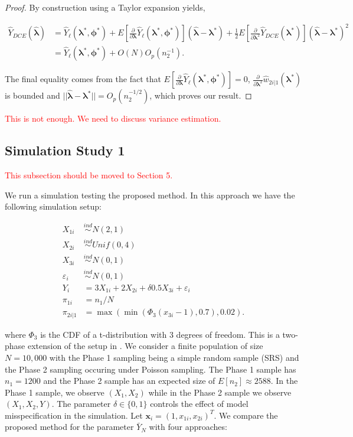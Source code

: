 \documentclass[12pt]{article}
\renewcommand{\bf}[1]{\mathbf{#1}}
\begin{document}
\begin{proof}
  By construction using a Taylor expansion yields,

  \begin{align*}
    \hat Y_{DCE}(\hat{\bm \lambda}) 
    &= \hat Y_\ell(\bm \lambda^*, \bm \phi^*) + 
    E\left[\frac{\partial}{\partial \bm \lambda}\hat Y_\ell(\bm \lambda^*,
    \bm \phi^*)\right](\hat{\bm \lambda} - \bm \lambda^*) + \frac{1}{2}
    E\left[\frac{\partial}{\partial \bm \lambda^2} \hat Y_{DCE}(\bm \lambda^*)\right] 
    (\hat{\bm \lambda} - \bm \lambda^*)^2\\
    &= \hat Y_\ell(\bm \lambda^*, \bm \phi^*) + O(N)O_p(n_2^{-1}).
  \end{align*}

  The final equality comes from the fact that 
  $E\left[\frac{\partial}{\partial \bm \lambda}
  \hat Y_\ell(\bm \lambda^*, \bm \phi^*)\right] = 0$,
  $\frac{\partial}{\partial \bm \lambda^2} \hat w_{2i|1}(\bm \lambda^*)$ is
  bounded and $||\hat{\bm \lambda} - \bm \lambda^*|| = O_p(n_2^{-1/2})$, which
  proves our result.
\end{proof}



\textcolor{red}{This is not enough. We need to discuss variance estimation. }
\subsection{Simulation Study 1}

\textcolor{red}{This subsection should be moved to Section 5. }

We run a simulation testing the proposed method. In this approach we have the
following simulation setup:

$$
\begin{aligned}
X_{1i} &\stackrel{ind}{\sim} N(2, 1) \\
X_{2i} &\stackrel{ind}{\sim} Unif(0, 4) \\
X_{3i} &\stackrel{ind}{\sim} N(0, 1) \\
\varepsilon_i &\stackrel{ind}{\sim} N(0, 1) \\
Y_{i} &= 3 X_{1i} + 2 X_{2i} + \delta 0.5 X_{3i} + \varepsilon_i \\
\pi_{1i} &= n_1 / N \\
\pi_{2i|1} &= \max(\min(\Phi_3(x_{3i} - 1), 0.7), 0.02).
\end{aligned}
$$

where $\Phi_3$ is the CDF of a t-distribution with 3 degrees of freedom.
This is a two-phase extension of the setup in \cite{kwon2024debiased}. We
consider a finite population of size $N = 10,000$ with the Phase 1 sampling
being a simple random sample (SRS) and the 
Phase 2 sampling occuring under Poisson sampling. The Phase 1 sample has
$n_1 = 1200$ and the Phase 2 sample has an expected size of
$E[n_2] \approx 2588$. In the Phase 1 sample, we observe 
$(X_1, X_2)$ while in the Phase 2 sample we observe $(X_1, X_2, Y)$. 
The parameter $\delta \in \{0, 1\}$ controls the effect of model misspecification
in the simulation. Let $\bf x_i = (1, x_{1i}, x_{2i})^T$. We compare the
proposed method for the parameter $\bar Y_N$ with four approaches:
\end{document}
